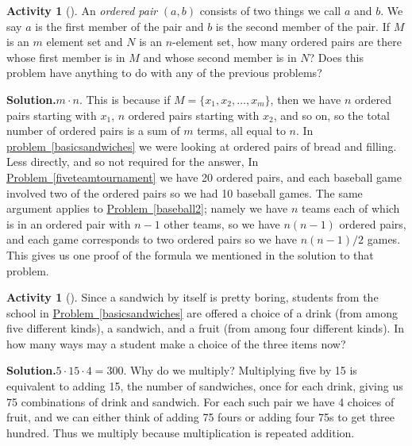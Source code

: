 \documentclass[10pt,]{book}
\theoremstyle{plain}
\theoremstyle{definition}
\newtheorem{activity}[project]{Activity}
\numberwithin{equation}{chapter}
\begin{document}
\begin{activity}[]\label{orderedpair}
An \emph{ordered pair} \((a,b)\) consists of two things we call \(a\) and \(b\). We say \(a\) is the first member of the pair and \(b\) is the second member of the pair. If \(M\) is an \(m\) element set and \(N\) is an \(n\)-element set, how many ordered pairs are there whose first member is in \(M\) and whose second member is in \(N\)? Does this problem have anything to do with any of the previous problems?%
\par\medskip\noindent%
\textbf{Solution.}\quad \(m\cdot n\). This is because if \(M = \{x_1,x_2,\ldots, x_m\}\), then we have \(n\) ordered pairs starting with \(x_1\), \(n\) ordered pairs starting with \(x_2\), and so on, so the total number of ordered pairs is a sum of \(m\) terms, all equal to \(n\). In \hyperref[basicsandwiches]{problem~\ref{basicsandwiches}} we were looking at ordered pairs of bread and filling. Less directly, and so not required for the answer, In \hyperref[fiveteamtournament]{Problem~\ref{fiveteamtournament}} we have 20 ordered pairs, and each baseball game involved two of the ordered pairs so we had 10 baseball games. The same argument applies to \hyperref[baseball2]{Problem~\ref{baseball2}}; namely we have \(n\) teams each of which is in an ordered pair with \(n-1\) other teams, so we have \(n(n-1)\) ordered pairs, and each game corresponds to two ordered pairs so we have \(n(n-1)/2\) games. This gives us one proof of the formula we mentioned in the solution to that problem.%
\end{activity}
\begin{activity}[]\label{completelunch}
Since a sandwich by itself is pretty boring, students from the school in \hyperref[basicsandwiches]{Problem~\ref{basicsandwiches}} are offered a choice of a drink (from among five different kinds), a sandwich, and a fruit (from among four different kinds). In how many ways may a student make a choice of the three items now?%
\par\medskip\noindent%
\textbf{Solution.}\quad \(5\cdot15\cdot4 = 300\). Why do we multiply? Multiplying five by 15 is equivalent to adding 15, the number of sandwiches, once for each drink, giving us 75 combinations of drink and sandwich. For each such pair we have 4 choices of fruit, and we can either think of adding 75 fours or adding four 75s to get three hundred. Thus we multiply because multiplication is repeated addition.%
\end{activity}
\end{document}
